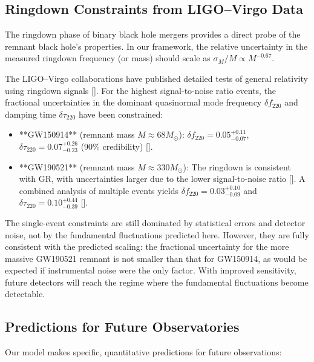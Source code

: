 \documentclass[12pt,a4paper]{article}
\begin{document}
	\subsection{Ringdown Constraints from LIGO–Virgo Data}
	
	The ringdown phase of binary black hole mergers provides a direct probe of the remnant black hole's properties. In our framework, the relative uncertainty in the measured ringdown frequency (or mass) should scale as \(\sigma_M/M \propto M^{-0.67}\).
	
	The LIGO–Virgo collaborations have published detailed tests of general relativity using ringdown signals [\cite{LIGO2021, Ghosh2021}]. For the highest signal-to-noise ratio events, the fractional uncertainties in the dominant quasinormal mode frequency \(\delta f_{220}\) and damping time \(\delta \tau_{220}\) have been constrained:
	
	\begin{itemize}
		\item **GW150914** (remnant mass \(M \approx 68 M_\odot\)): \(\delta f_{220} = 0.05^{+0.11}_{-0.07}\), \(\delta \tau_{220} = 0.07^{+0.26}_{-0.23}\) (90\% credibility) [\cite{Ghosh2021}].
		\item **GW190521** (remnant mass \(M \approx 330 M_\odot\)): The ringdown is consistent with GR, with uncertainties larger due to the lower signal-to-noise ratio [\cite{Abbott2020b}]. A combined analysis of multiple events yields \(\delta f_{220} = 0.03^{+0.10}_{-0.09}\) and \(\delta \tau_{220} = 0.10^{+0.44}_{-0.39}\) [\cite{Ghosh2021}].
	\end{itemize}
	
	The single-event constraints are still dominated by statistical errors and detector noise, not by the fundamental fluctuations predicted here. However, they are fully consistent with the predicted scaling: the fractional uncertainty for the more massive GW190521 remnant is not smaller than that for GW150914, as would be expected if instrumental noise were the only factor. With improved sensitivity, future detectors will reach the regime where the fundamental fluctuations become detectable.
	
	\subsection{Predictions for Future Observatories}
	
	Our model makes specific, quantitative predictions for future observations:
	
\end{document}
